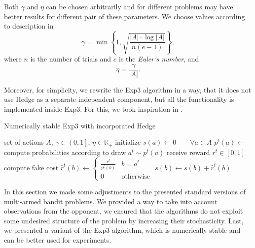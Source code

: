 \documentclass[../main.tex]{subfiles}
\begin{document}
Both $\gamma$ and $\eta$ can be chosen arbitrarily and for different problems may have better results for different pair of these parameters.
We choose values according to description in \cite{exp3formula}
\begin{equation}\label{new:bandit:instability:params}
    \gamma = \min\left\{1, \sqrt{\frac{|A|\cdot\log|A|}{n(e - 1)}}\right\},
\end{equation}
where $n$ is the number of trials and $e$ is the \textit{Euler's number}, and
\begin{equation}
    \eta = \frac{\gamma}{|A|}.
\end{equation}

Moreover, for simplicity, we rewrite the Exp3 algorithm  in a way, that it does not use Hedge as a separate independent component, but all the functionality is implemented inside Exp3.
For this, we took inspiration in \cite{exp3alg}.
\begin{algorithm}[ht]
    \caption{Numerically stable Exp3 with incorporated Hedge}
    \label{new:bandit:instability:exp3}
    \begin{algorithmic}[1]
        \Require set of actions $A$, $\gamma \in \left(0, 1\right]$, $\eta \in \mathbb{R}_{+}$
        \State initialize $s(a) \leftarrow 0 \qquad \forall a \in A$
            \State $p^t(a) \leftarrow$ compute probabilities according to 
            \State draw $a^t \sim p^t(a)$ 
            \State receive reward $r^t \in \left[0, 1\right]$
                \State compute fake cost $\hat{r}^t(b) \leftarrow \begin{cases}\frac{r^t}{p^t(b)} & b = a^t \\ 0 & \text{otherwise}\end{cases}$
                \State $s(b) \leftarrow s(b) + \hat{r}^t(b)$
            \EndFor
        \EndFor
    \end{algorithmic}
\end{algorithm}

In this section we made some adjustments to the presented standard versions of multi-armed bandit problems.
We provided a way to take into account observations from the opponent, we ensured that the algorithms do not exploit some undesired structure of the problem by increasing their stochasticity.
Last, we presented a variant of the Exp3 algorithm, which is numerically stable and can be better used for experiments.
\end{document}
